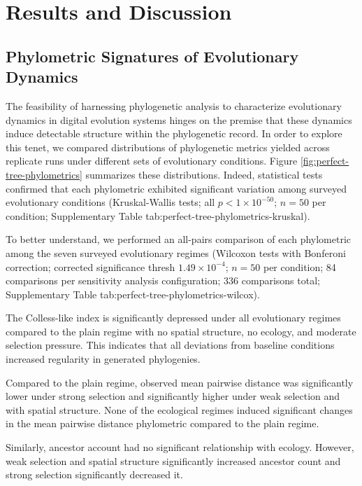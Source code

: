 \section{Results and Discussion} \label{sec:results}

\subsection{Phylometric Signatures of Evolutionary Dynamics}



The feasibility of harnessing phylogenetic analysis to characterize evolutionary dynamics in digital evolution systems hinges on the premise that these dynamics induce detectable structure within the phylogenetic record.
In order to explore this tenet, we compared distributions of phylogenetic metrics yielded across replicate runs under different sets of evolutionary conditions. Figure \ref{fig:perfect-tree-phylometrics} summarizes these distributions.  Indeed, statistical tests confirmed that each phylometric exhibited significant  variation among surveyed evolutionary conditions (Kruskal-Wallis tests; all $p < 1\times10^{-50}$; $n=50$ per condition; Supplementary Table tab:perfect-tree-phylometrics-kruskal).

To better understand, we performed an all-pairs comparison of each phylometric among the seven surveyed evolutionary regimes (Wilcoxon tests with Bonferoni correction; corrected significance thresh $1.49 \times 10^{-4}$; $n=50$ per condition; 84 comparisons per sensitivity analysis configuration; 336 comparisons total; Supplementary Table tab:perfect-tree-phylometrics-wilcox).

 The Colless-like index is significantly depressed under all evolutionary regimes compared to the plain regime with no spatial structure, no ecology,  and moderate selection pressure.
This indicates that all deviations from baseline conditions increased regularity in generated phylogenies.

Compared to the plain regime, observed mean pairwise distance was significantly lower under strong selection and significantly higher under weak selection and with spatial structure.
None of the ecological regimes induced significant changes in the mean pairwise distance phylometric compared to the plain regime.

Similarly, ancestor account had no significant relationship with ecology. However, weak selection and spatial structure significantly increased ancestor count and strong selection significantly decreased it.

